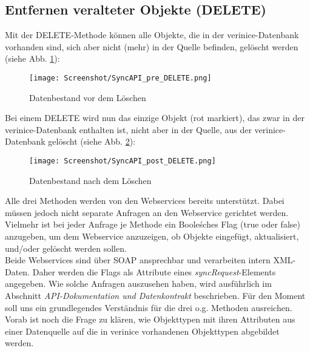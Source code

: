 \documentclass[a4paper,10pt]{book}
\begin{document}
\subsection{Entfernen veralteter Objekte (DELETE)}
Mit der \textsc{DELETE}-Methode können alle Objekte, die in der verinice-Datenbank vorhanden sind,
sich aber nicht (mehr) in der Quelle befinden, gelöscht werden (siehe Abb. \ref{Datenbestand vor dem Loeschen}):
\newline
\begin{figure}[htb!]
  \centering
  \texttt{[image: Screenshot/SyncAPI\_pre\_DELETE.png]}
  \caption{\label{Datenbestand vor dem Loeschen} Datenbestand vor dem Löschen}
\end{figure}
\newline
Bei einem \textsc{DELETE} wird nun das einzige Objekt (rot markiert), das zwar in der verinice-Datenbank enthalten
ist, nicht aber in der Quelle, aus der verinice-Datenbank gelöscht (siehe Abb. \ref{Datenbestand nach dem Loeschen}):
\newline
\begin{figure}[htb!]
  \centering
  \texttt{[image: Screenshot/SyncAPI\_post\_DELETE.png]}
  \caption{\label{Datenbestand nach dem Loeschen} Datenbestand nach dem Löschen}
\end{figure}
\newline
Alle drei Methoden werden von den Webservices bereits unterstützt. Dabei müssen jedoch nicht separate Anfragen an
den Webservice gerichtet werden. Vielmehr ist bei jeder Anfrage je Methode ein Boole\'sches Flag (true oder false) anzugeben, um dem Webservice anzuzeigen, ob Objekte eingefügt, aktualisiert, und/oder gelöscht werden sollen.
\newline\\
Beide Webservices sind über SOAP ansprechbar und verarbeiten intern XML-Daten. Daher werden die Flags als Attribute eines
\textit{syncRequest}-Elements angegeben. Wie solche Anfragen auszusehen haben, wird ausführlich im Abschnitt
\textit{API-Dokumentation und Datenkontrakt} beschrieben. Für den Moment soll uns ein grundlegendes Verständnis
für die drei o.g. Methoden ausreichen.
\newline\\
Vorab ist noch die Frage zu klären, wie Objekttypen mit ihren Attributen aus einer Datenquelle auf die in
verinice vorhandenen Objekttypen abgebildet werden.
\end{document}
